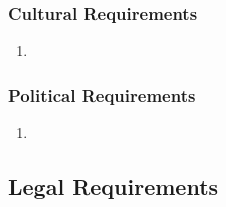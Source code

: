 \documentclass[]{article}
\begin{document}
\subsubsection{Cultural Requirements}
\label{ssub:cultural_requirements}
\begin{enumerate}[{CP-C}1. ]
	\item 
\end{enumerate}

\subsubsection{Political Requirements}
\label{ssub:political_requirements}
\begin{enumerate}[{CP-P}1. ]
	\item 
\end{enumerate}


\subsection{Legal Requirements}
\label{sub:legal_requirements}
\end{document}
